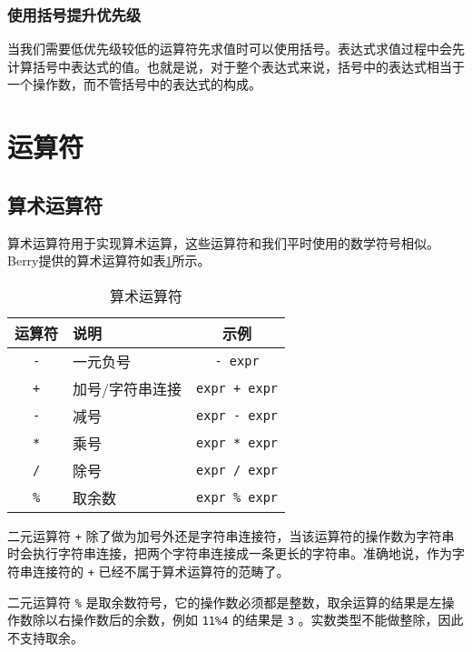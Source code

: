 \subsubsection{使用括号提升优先级}

当我们需要低优先级较低的运算符先求值时可以使用括号。表达式求值过程中会先计算括号中表达式的值。也就是说，对于整个表达式来说，括号中的表达式相当于一个操作数，而不管括号中的表达式的构成。

\section{运算符}

\subsection{算术运算符}

算术运算符用于实现算术运算，这些运算符和我们平时使用的数学符号相似。Berry提供的算术运算符如表\ref{tab::arthmetic_operator}所示。

\begin{table}[htb]
    \centering
    \setlength{\tabcolsep}{10mm}
    \begin{tabular}{clc} \toprule
        \textbf{运算符} & \textbf{说明} & \textbf{示例} \\ \midrule
        \texttt{-} & 一元负号 & \texttt{- expr} \\
        \texttt{+} & 加号/字符串连接 & \texttt{expr + expr} \\
        \texttt{-} & 减号 & \texttt{expr - expr} \\
        \texttt{*} & 乘号 & \texttt{expr * expr} \\
        \texttt{/} & 除号 & \texttt{expr / expr} \\
        \texttt{\%} & 取余数 & \texttt{expr \% expr} \\
        \bottomrule
    \end{tabular}
    \caption{算术运算符}
    \label{tab::arthmetic_operator}
\end{table}

二元运算符 \texttt{+} 除了做为加号外还是字符串连接符，当该运算符的操作数为字符串时会执行字符串连接，把两个字符串连接成一条更长的字符串。准确地说，作为字符串连接符的 \texttt{+} 已经不属于算术运算符的范畴了。

二元运算符 \texttt{\%} 是取余数符号，它的操作数必须都是整数，取余运算的结果是左操作数除以右操作数后的余数，例如 \texttt{11\%4} 的结果是 \texttt{3} 。实数类型不能做整除，因此不支持取余。

